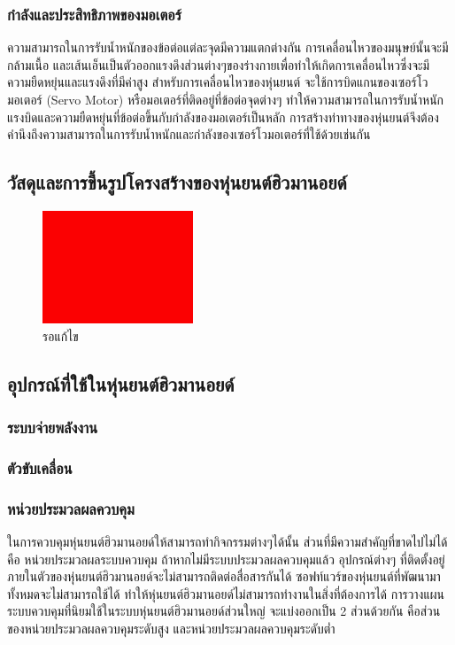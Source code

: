 \subsubsection{กำลังและประสิทธิภาพของมอเตอร์}
ความสามารถในการรับน้ำหนักของข้อต่อแต่ละจุดมีความแตกต่างกัน การเคลื่อนไหวของมนุษย์นั้นจะมีกล้ามเนื้อ
และเส้นเอ็นเป็นตัวออกแรงดึงส่วนต่างๆของร่างกายเพื่อทำให้เกิดการเคลื่อนไหวซึ่งจะมีความยืดหยุ่นและแรงดึงที่มีค่าสูง
สำหรับการเคลื่อนไหวของหุ่นยนต์ จะใช้การบิดแกนของเซอร์โวมอเตอร์ (Servo Motor) หรือมอเตอร์ที่ติดอยู่ที่ข้อต่อจุดต่างๆ
ทำให้ความสามารถในการรับน้ำหนัก แรงบิดและความยืดหยุ่นที่ข้อต่อขึ้นกับกำลังของมอเตอร์เป็นหลัก
การสร้างท่าทางของหุ่นยนต์จึงต้องคำนึงถึงความสามารถในการรับน้ำหนักและกำลังของเซอร์โวมอเตอร์ที่ใช้ด้วยเช่นกัน

\subsection{วัสดุและการขึ้นรูปโครงสร้างของหุ่นยนต์ฮิวมานอยด์}
\begin{figure}[htbp]
    \centering
    \includegraphics[width=0.40\textwidth]{chapter2/images/toedit.jpg}
    \caption{รอแก้ไข}
    \label{fig:toedit}
\end{figure}

\subsection{อุปกรณ์ที่ใช้ในหุ่นยนต์ฮิวมานอยด์}

\subsubsection{ระบบจ่ายพลังงาน}
\subsubsection{ตัวขับเคลื่อน}

\subsubsection{หน่วยประมวลผลควบคุม}
ในการควบคุมหุ่นยนต์ฮิวมานอยด์ให้สามารถทำกิจกรรมต่างๆได้นั้น ส่วนที่มีความสำคัญที่ขาดไปไม่ได้ คือ
หน่วยประมวลผลระบบควบคุม ถ้าหากไม่มีระบบประมวลผลควบคุมแล้ว อุปกรณ์ต่างๆ ที่ติดตั้งอยู่ภายในตัวของหุ่นยนต์ฮิวมานอยด์จะไม่สามารถติดต่อสื่อสารกันได้
ซอฟท์แวร์ของหุ่นยนต์ที่พัฒนามาทั้งหมดจะไม่สามารถใช้ได้ ทำให้หุ่นยนต์ฮิวมานอยด์ไม่สามารถทำงานในสิ่งที่ต้องการได้ 
การวางแผนระบบควบคุมที่นิยมใช้ในระบบหุ่นยนต์ฮิวมานอยด์ส่วนใหญ่ จะแบ่งออกเป็น 2 ส่วนด้วยกัน 
คือส่วนของหน่วยประมวลผลควบคุมระดับสูง และหน่วยประมวลผลควบคุมระดับต่ำ

